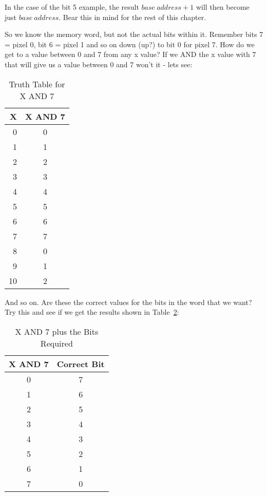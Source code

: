 In the case of the bit 5 example, the result $base~address + 1$ will then become just $base~address$. Bear this in mind for the rest of this chapter.


So we know the memory word, but not the actual bits within it.
    Remember bits 7 = pixel 0, bit 6 = pixel 1 and so on down (up?) to bit 0
    for pixel 7. How do we get to a value between 0 and 7 from any x value? If
    we AND the x value with 7 that will give us a value between 0 and 7 won't
    it -{} lets see:


\begin{table}[htbp]
\centering
\begin{tabular}{r c}
\toprule
\textbf{X} & \textbf{X AND 7} \\
\midrule
%
0 & 0 \\
1 & 1 \\
2 & 2 \\
3 & 3 \\
4 & 4 \\
5 & 5 \\
6 & 6 \\
7 & 7 \\
8 & 0 \\
9 & 1 \\
10 & 2 \\
%
\bottomrule
\end{tabular}
\caption{Truth Table for X AND 7}
\label{tab:TruthTableForXAnd7}
\end{table}

And so on. Are these the correct values for the bits in the word
    that we want? Try this and see if we get the results shown in Table~\ref{tab:Xand7PlusBitsRequired}:


\begin{table}[htbp]
\centering
\begin{tabular}{c c}
\toprule
\textbf{X AND 7} & \textbf{Correct Bit} \\
\midrule
%
0 & 7 \\
1 & 6 \\
2 & 5 \\
3 & 4 \\
4 & 3 \\
5 & 2 \\
6 & 1 \\
7 & 0 \\
%
\bottomrule
\end{tabular}
\caption{X AND 7 plus the Bits Required}
\label{tab:Xand7PlusBitsRequired}
\end{table}

